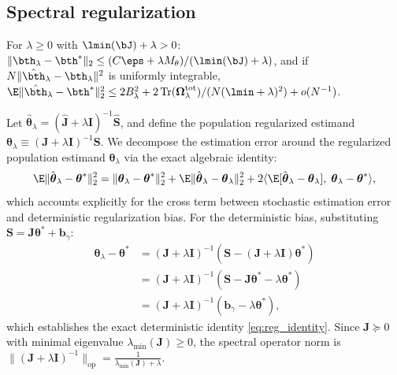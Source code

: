 \subsection{Spectral regularization}
\begin{theorem}
\label{thm:spectral}
For $\lambda\ge0$ with $\lmin(\bJ)+\lambda>0$: $\|\bth_\lambda-\bth^*\|_2\le(C\eps+\lambda M_\theta)/(\lmin(\bJ)+\lambda)$, and if $N\|\hat\bth_\lambda-\bth_\lambda\|^2$ is uniformly integrable, $\E\|\hat\bth_\lambda-\bth^*\|_2^2\le2B_\lambda^2+2\,\mathrm{Tr}(\boldsymbol\Omega^{\rm tot}_\lambda)/(N(\lmin+\lambda)^2)+o(N^{-1})$.
\end{theorem}
Let $\hat{\boldsymbol{\theta}}_\lambda = (\hat{\boldsymbol{J}} + \lambda \boldsymbol{I})^{-1} \hat{\boldsymbol{S}}$, and define the population regularized estimand $\boldsymbol{\theta}_\lambda \equiv (\boldsymbol{J} + \lambda \boldsymbol{I})^{-1} \boldsymbol{S}$.
We decompose the estimation error around the regularized population estimand $\boldsymbol{\theta}_\lambda$ via the exact algebraic identity:
\begin{equation}
\label{eq:exact_decomp}
    \E\|\hat{\boldsymbol{\theta}}_\lambda - \boldsymbol{\theta}^*\|_2^2 = \|\boldsymbol{\theta}_\lambda - \boldsymbol{\theta}^*\|_2^2 + \E\|\hat{\boldsymbol{\theta}}_\lambda - \boldsymbol{\theta}_\lambda\|_2^2 + 2 \langle \E[\hat{\boldsymbol{\theta}}_\lambda - \boldsymbol{\theta}_\lambda], \; \boldsymbol{\theta}_\lambda - \boldsymbol{\theta}^* \rangle,
\end{equation}
which accounts explicitly for the cross term between stochastic estimation error and deterministic regularization bias.
For the deterministic bias, substituting $\boldsymbol{S} = \boldsymbol{J}\boldsymbol{\theta}^* + \boldsymbol{b}_\gamma$:
\begin{align}
    \boldsymbol{\theta}_\lambda - \boldsymbol{\theta}^* &= (\boldsymbol{J} + \lambda \boldsymbol{I})^{-1} \left( \boldsymbol{S} - (\boldsymbol{J} + \lambda \boldsymbol{I})\boldsymbol{\theta}^* \right) \nonumber \\
    &= (\boldsymbol{J} + \lambda \boldsymbol{I})^{-1} \left( \boldsymbol{S} - \boldsymbol{J}\boldsymbol{\theta}^* - \lambda \boldsymbol{\theta}^* \right) \nonumber \\
    &= (\boldsymbol{J} + \lambda \boldsymbol{I})^{-1} \left( \boldsymbol{b}_\gamma - \lambda \boldsymbol{\theta}^* \right), \label{eq:reg_identity}
\end{align}
which establishes the exact deterministic identity \eqref{eq:reg_identity}.
Since $\boldsymbol{J} \succeq 0$ with minimal eigenvalue $\lambda_{\min}(\boldsymbol{J}) \ge 0$, the spectral operator norm is $\|(\boldsymbol{J} + \lambda \boldsymbol{I})^{-1}\|_{\mathrm{op}} = \frac{1}{\lambda_{\min}(\boldsymbol{J}) + \lambda}$.
